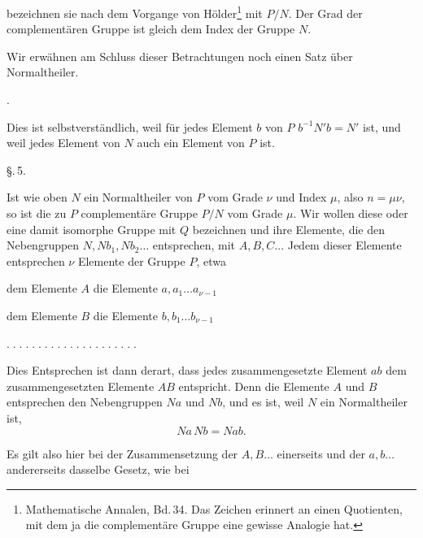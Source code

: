 

bezeichnen sie nach dem Vorgange von Hölder\footnote{Mathematische Annalen, Bd.\,34. Das Zeichen erinnert an einen Quotienten, mit dem ja die complementäre Gruppe eine gewisse Analogie hat.} mit $P/N$. Der Grad der complementären Gruppe ist gleich dem Index der Gruppe $N$.

Wir erwähnen am Schluss dieser Betrachtungen noch einen Satz über Normaltheiler.

.\ 

Dies ist selbstverständlich, weil für jedes Element $b$ von $P$ $b^{-1}N'b = N'$ ist, und weil jedes Element von $N$ auch ein Element von $P$ ist.


\begin{center}
\S.\,5.

\end{center}

Ist wie oben $N$ ein Normaltheiler von $P$ vom Grade $\nu$ und Index $\mu$, also $n = \mu \nu$, so ist die zu $P$ complementäre Gruppe $P/N$ vom Grade $\mu$. Wir wollen diese oder eine damit isomorphe Gruppe mit $Q$ bezeichnen und ihre Elemente, die den Nebengruppen $N, Nb_1, Nb_2 \dots$ entsprechen, mit $A, B, C \dots$ Jedem dieser Elemente entsprechen $\nu$ Elemente der Gruppe $P$, etwa

\noindent dem Elemente $A$ die Elemente $a, a_1 \dots a_{\nu-1}$

\noindent dem Elemente $B$ die Elemente $b, b_1 \dots b_{\nu-1}$

\noindent $. \; . \; . \; . \; . \; . \; . \; . \; . \; . \; . \; . \; . \; . \; . \; . \; . \; . \; . \; . \; .$

Dies Entsprechen ist dann derart, dass jedes zusammengesetzte Element $ab$ dem zusammengesetzten Elemente $AB$ entspricht. Denn die Elemente $A$ und $B$ entsprechen den Nebengruppen $Na$ und $Nb$, und es ist, weil $N$ ein Normaltheiler ist,
\[
Na \, Nb = Nab.
\]

Es gilt also hier bei der Zusammensetzung der $A, B \dots$ einerseits und der $a, b \dots$ andererseits dasselbe Gesetz, wie bei
